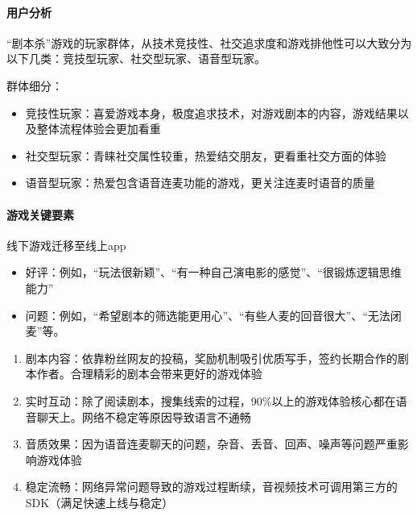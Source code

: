 \documentclass[letterpaper,11pt,english]{sphinxmanual}
\begin{document}
\paragraph{用户分析}
\label{\detokenize{chapter_experience/jubensha:id5}}
“剧本杀”游戏的玩家群体，从技术竞技性、社交追求度和游戏排他性可以大致分为以下几类：竞技型玩家、社交型玩家、语音型玩家。

群体细分：
\begin{itemize}
\item {} 
竞技性玩家：喜爱游戏本身，极度追求技术，对游戏剧本的内容，游戏结果以及整体流程体验会更加看重

\item {} 
社交型玩家：青睐社交属性较重，热爱结交朋友，更看重社交方面的体验

\item {} 
语音型玩家：热爱包含语音连麦功能的游戏，更关注连麦时语音的质量

\end{itemize}


\paragraph{游戏关键要素}
\label{\detokenize{chapter_experience/jubensha:id6}}
线下游戏迁移至线上app
\begin{itemize}
\item {} 
好评：例如，“玩法很新颖”、“有一种自己演电影的感觉”、“很锻炼逻辑思维能力”

\item {} 
问题：例如，“希望剧本的筛选能更用心”、“有些人麦的回音很大”、“无法闭麦”等。

\end{itemize}
\begin{enumerate}
%
\item {} 
剧本内容：依靠粉丝网友的投稿，奖励机制吸引优质写手，签约长期合作的剧本作者。合理精彩的剧本会带来更好的游戏体验

\item {} 
实时互动：除了阅读剧本，搜集线索的过程，90\%以上的游戏体验核心都在语音聊天上。网络不稳定等原因导致语言不通畅

\item {} 
音质效果：因为语音连麦聊天的问题，杂音、丢音、回声、噪声等问题严重影响游戏体验

\item {} 
稳定流畅：网络异常问题导致的游戏过程断续，音视频技术可调用第三方的SDK（满足快速上线与稳定）

\end{enumerate}
\end{document}
